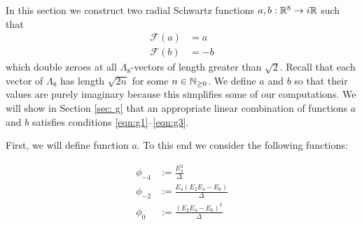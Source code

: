 
In this section we construct two radial Schwartz functions $a,b:\mathbb{R}^8\to i\mathbb{R}$ such that
\begin{align}\mathcal{F}(a)&=a\label{eqn:a-fourier}\\
    \mathcal{F}(b)&=-b\label{eqn:b-fourier}
\end{align}
which double zeroes at all $\Lambda_8$-vectors of length greater than $\sqrt{2}$. Recall that each vector of $\Lambda_8$ has length $\sqrt{2n}$ for some $n\in\mathbb{N}_{\geq 0}$. We define $a$ and $b$ so that their values are purely imaginary because this simplifies some of our computations. We will show in Section \ref{sec: g} that an appropriate linear combination of functions $a$ and $b$ satisfies conditions \eqref{eqn:g1}--\eqref{eqn:g3}.

First, we will define function $a$. To this end we consider the following functions:
\begin{definition}\label{def:phi4-phi2-phi0}
\begin{align}
    \phi_{-4} &:= \frac{E_4^2}{\Delta} \label{eqn: def phi4} \\
    \phi_{-2} &:= \frac{E_4(E_2 E_4 - E_6)}{\Delta} \label{eqn: def phi2} \\
    \phi_{0} &:= \frac{(E_2 E_4 - E_6)^2}{\Delta} \label{eqn: def phi0}
\end{align}
\end{definition}


